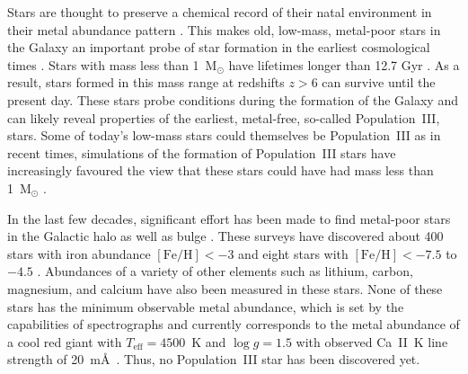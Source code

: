 \documentclass[a4paper,fleqn,usenatbib]{mnras}
\begin{document}
Stars are thought to preserve a chemical record of their natal
environment in their metal abundance pattern
\citep{2013pss5.book...55F}.  This makes old, low-mass, metal-poor
stars in the Galaxy an important probe of star formation in the
earliest cosmological times \citep{2015ARA&A..53..631F}.  Stars with
mass less than 1~M$_\odot$ have lifetimes longer than 12.7 Gyr
\citep{1989A&A...210..155M}.  As a result, stars formed in this mass
range at redshifts $z>6$ can survive until the present day.  These
stars probe conditions during the formation of the Galaxy and can
likely reveal properties of the earliest, metal-free, so-called
Population~III, stars.  Some of today's low-mass stars could
themselves be Population~III \citep{2015MNRAS.453.2771J} as in recent
times, simulations of the formation of Population~III stars have
increasingly favoured the view that these stars could have had mass
less than 1~M$_\odot$ \citep{2011ApJ...727..110C, 2011ApJ...737...75G,
  2013ApJ...766..103D, 2014ApJ...781...60H, 2014ApJ...785...73S,
  2014ApJ...792...32S, 2015MNRAS.448.1405M, 2016MNRAS.462.1307S}.

In the last few decades, significant effort has been made to find
metal-poor stars in the Galactic halo \citep{1981ApJ...248..606B,
  2004A&A...416.1117C, 2005ARA&A..43..531B, 2007ApJ...670..774N,
  2008PASJ...60.1159S, 2011Natur.477...67C, 2014Natur.506..463K,
  2014ApJ...787..162H, 2015ApJ...806L..16B} as well as bulge
\citep{2016MNRAS.460..884H, 2016PASA...33...22N, 2015Natur.527..484H,
  2015ApJ...809..110C, 2015ApJ...807..171J}.  These surveys have
discovered about 400 stars with iron abundance
$[\mathrm{Fe}/\mathrm{H}]<-3$ and eight stars with
$[\mathrm{Fe}/\mathrm{H}]<-7.5$ to $-4.5$ \citep{2015ARA&A..53..631F}.
Abundances of a variety of other elements such as lithium, carbon,
magnesium, and calcium have also been measured in these stars.  None
of these stars has the minimum observable metal abundance, which is
set by the capabilities of spectrographs and currently corresponds to
the metal abundance of a cool red giant with $T_\mathrm{eff}=4500$~K
and $\log g=1.5$ with observed Ca~II~K line strength of
20~m\AA\ \citep{2015ARA&A..53..631F}.  Thus, no Population~III star
has been discovered yet.
\end{document}
